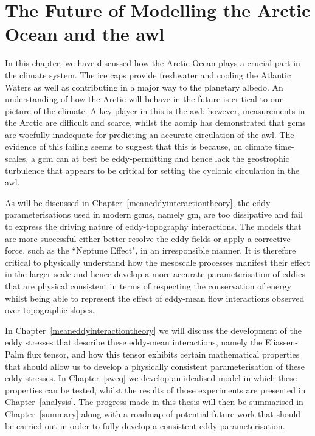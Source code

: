 \documentclass[12pt,a4paper]{report}
\begin{document}
\section{The Future of Modelling the Arctic Ocean and the \gls{awl}}

In this chapter, we have discussed how the Arctic Ocean plays a crucial part in the
climate system. The ice caps provide freshwater and cooling the Atlantic Waters as 
well as contributing in a major way to the planetary albedo. An understanding of how
the Arctic will behave in the future is critical to our picture of the climate.
A key player in this is the \gls{awl}; however, measurements in the Arctic are
difficult and scarce, whilst the \gls{aomip} has demonstrated that \glspl{gcm} are woefully inadequate for predicting an accurate circulation of the \gls{awl}. 
The evidence of this failing seems to suggest that this is because, on 
climate time-scales, a \gls{gcm} can at best be eddy-permitting and hence
lack the geostrophic turbulence that appears to be critical for setting the 
cyclonic circulation in the \gls{awl}. 

As will be discussed in Chapter~\ref{meaneddyinteractiontheory},
the eddy parameterisations used in modern \glspl{gcm}, namely \gls{gm}, are too 
dissipative and fail to express the driving nature of eddy-topography interactions. 
The models that are more successful either better resolve the eddy fields or apply 
a corrective force, such as the ``Neptune Effect", in an irresponsible manner. 
It is therefore critical to physically understand how the mesoscale processes
manifest their effect in the larger scale and hence develop a more accurate
parameterisation of eddies that are physical consistent in terms of respecting
the conservation of energy whilst being able to represent the effect of eddy-mean flow
 interactions observed over topographic slopes.
 
 In Chapter~\ref{meaneddyinteractiontheory} we will discuss the development
 of the eddy stresses that describe these eddy-mean interactions, namely the Eliassen-Palm
 flux tensor, and how this tensor exhibits certain mathematical properties that
 should allow us to develop a physically consistent parameterisation of these 
 eddy stresses. In Chapter~\ref{sweq} we develop an idealised model in which these
 properties can be tested, whilst the results of those experiments are presented in 
 Chapter~\ref{analysis}. The progress made in this thesis will then be summarised
 in Chapter~\ref{summary} along with a roadmap of potential future work that 
 should be carried out in order to fully develop a consistent eddy parameterisation.
\end{document}
